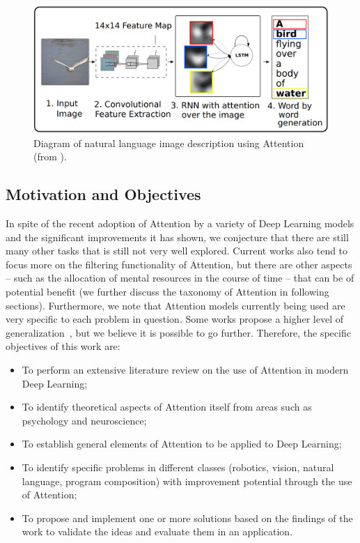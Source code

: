 \documentclass[12pt]{article}
\begin{document}
\newpage
\begin{figure}
\begin{center}
	\includegraphics[width=0.7\linewidth]{./img/img_captioning.png}
\caption{
    Diagram of natural language image description using Attention
    (from \cite{ref:img-captioning}).
}
\label{fig:description}
\end{center}
\end{figure}

\subsection{Motivation and Objectives}
In spite of the recent adoption of Attention by a variety of Deep Learning models
and the significant improvements it has shown, we conjecture that there are still many other tasks
that is still not very well explored.
Current works also tend to focus more on the filtering functionality of Attention,
but there are other aspects
-- such as the allocation of mental resources in the course of time -- that can be of potential benefit
(we further discuss the taxonomy of Attention in following sections).
Furthermore, we note that Attention models currently being used
are very specific to each problem in question.
Some works propose a higher level of generalization~\cite{ref:rec-models},
but we believe it is possible to go further.
Therefore, the specific objectives of this work are:
\begin{itemize}
    \item To perform an extensive literature review on the use of Attention
        in modern Deep Learning;
    \item To identify theoretical aspects of Attention itself from areas such as psychology and neuroscience;
    \item To establish general elements of Attention to be applied to Deep Learning;
    \item To identify specific problems in different classes
        (robotics, vision, natural language, program composition) with
        improvement potential through the use of Attention;
    \item To propose and implement one or more solutions based on the findings of the work to
        validate the ideas and evaluate them in an application.
\end{itemize}
\end{document}
